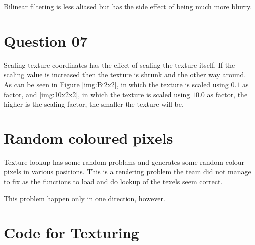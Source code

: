     Bilinear filtering is less aliased but has the side effect of being much more blurry.

  \section{Question 07}
    
    Scaling texture coordinates has the effect of scaling the texture itself. If the scaling value is increased then the
    texture is shrunk and the other way around. As can be seen in Figure \ref{img:Bi2x2}, in which the texture is scaled
    using $0.1$ as factor, and \ref{img:10x2x2}, in which the texture is scaled using $10.0$ as factor, the higher is
    the scaling factor, the smaller the texture will be.

  \section{Random coloured pixels}

    Texture lookup has some random problems and generates some random colour pixels in various positions. This is a
    rendering problem the team did not manage to fix as the functions to load and do lookup of the texels seem correct.
    
    This problem happen only in one direction, however.

  \section{Code for Texturing}
    
